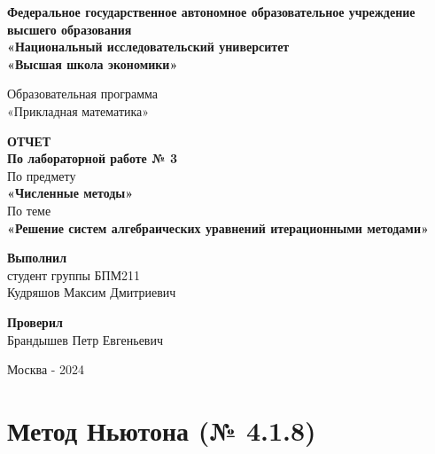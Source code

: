 \documentclass[a4paper,11pt]{article}
\theoremstyle{definition} %
\theoremstyle{remark} %
\begin{document}
\begin{titlepage} %
\pagestyle{empty}
\begin{center}

\Large
\textbf{Федеральное государственное автономное образовательное учреждение высшего образования\\
«Национальный исследовательский университет\\
«Высшая школа экономики»}\\
\vspace{5mm}

\Large
Образовательная программа \\
«Прикладная математика»
\vspace{40mm}

\Large
\textbf{ОТЧЕТ} \\
\textbf{По лабораторной работе № 3} \\
\vspace{5mm}
\Large По предмету \\
\LARGE\textbf{«Численные методы»} \\
\vspace{5mm}
\Large По теме \\
\LARGE\textbf{«Решение систем алгебраических уравнений итерационными методами»}
\end{center}

\begin{center}
\vfill

\large
\begin{flushright}
\textbf{Выполнил} \\
студент группы БПМ211 \\
Кудряшов Максим Дмитриевич \\
\end{flushright}

\large
\begin{flushright}
\textbf{Проверил} \\
Брандышев Петр Евгеньевич \\
\end{flushright}

\large
\vspace{20mm}
Москва - 2024
\end{center}
\end{titlepage} %

\newpage
\tableofcontents
\newpage

\section{Метод Ньютона (№ 4.1.8)}
\end{document}

